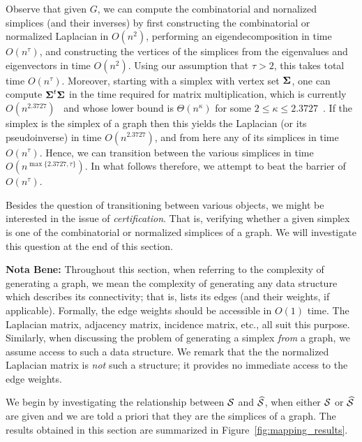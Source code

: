 Observe that given $G$, we can compute the combinatorial and nornalized simplices (and their inverses) by first constructing the combinatorial or normalized Laplacian in $O(n^2)$, performing an eigendecomposition in time $O(n^\tau)$, and constructing the vertices of the simplices from the eigenvalues and eigenvectors in time $O(n^2)$. Using our  assumption that $\tau>2$, this takes total time $O(n^\tau)$.  Moreover, starting with a simplex with vertex set $\boldsymbol{\Sigma}$, one can compute $\boldsymbol{\Sigma}^t\boldsymbol{\Sigma}$ in the time required for matrix multiplication, which is currently $O(n^{2.3727})$~\cite{williams2012multiplying} and whose lower bound is $\Theta(n^\kappa)$ for some $2\leq \kappa\leq 2.3727$~\cite{stothers2010complexity}. If the simplex is the simplex of a graph then this yields the Laplacian (or its pseudoinverse) in time $O(n^{2.3727})$,  and from here any of its simplices  in time $O(n^\tau)$. Hence, we can transition between the various simplices in time $O(n^{\max\{2.3727,\tau\}})$.  In what follows therefore, we attempt to beat the barrier of $O(n^\tau)$. 

Besides  the question  of transitioning between various objects, we might be interested in the issue of \emph{certification}. That is, verifying whether  a given simplex is one of the combinatorial or normalized simplices of a graph. We will investigate  this question at  the end of this  section. 

\textbf{Nota Bene:} Throughout this section, when referring to the complexity  of generating a graph, we mean the complexity of generating any data structure which describes its connectivity; that is,  lists its  edges (and their weights, if applicable). Formally, the edge weights should be accessible  in $O(1)$ time. The Laplacian matrix,  adjacency matrix, incidence matrix,  etc.,  all suit this  purpose.  Similarly, when discussing the problem of  generating a simplex \emph{from} a graph,  we assume access to such a data structure. We remark that the the normalized Laplacian matrix is \emph{not} such a structure; it  provides no  immediate  access to the  edge weights.

We begin by investigating the relationship between $\mathcal{S}$ and $\widehat{\mathcal{S}}$, when either  $\mathcal{S}$ or $\widehat{\mathcal{S}}$ are given and we are told a priori that they are the simplices of a graph. The results obtained  in this section are summarized in Figure~\ref{fig:mapping_results}. 

